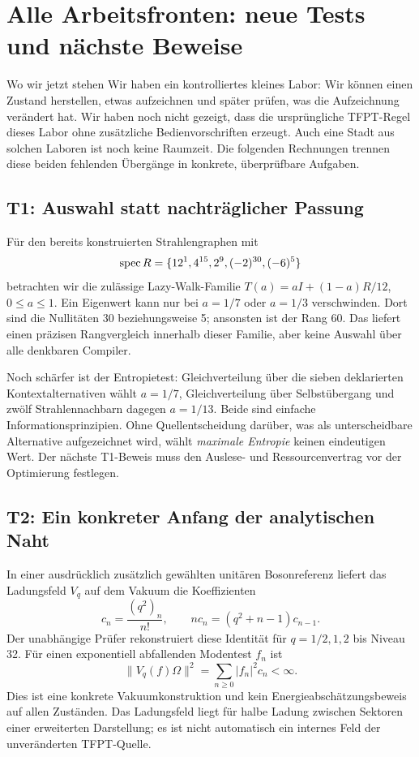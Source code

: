 \chapter{Alle Arbeitsfronten: neue Tests und nächste Beweise}
\label{ch:fronts14}

\begin{bild}{Wo wir jetzt stehen}
Wir haben ein kontrolliertes kleines Labor: Wir können einen Zustand herstellen, etwas aufzeichnen und später prüfen, was die Aufzeichnung verändert hat. Wir haben noch nicht gezeigt, dass die ursprüngliche TFPT-Regel dieses Labor ohne zusätzliche Bedienvorschriften erzeugt. Auch eine Stadt aus solchen Laboren ist noch keine Raumzeit. Die folgenden Rechnungen trennen diese beiden fehlenden Übergänge in konkrete, überprüfbare Aufgaben.
\end{bild}

\section{T1: Auswahl statt nachträglicher Passung}
Für den bereits konstruierten Strahlengraphen mit
\begin{equation}
\operatorname{spec} R=\{12^1,4^{15},2^9,(-2)^{30},(-6)^5\}
\end{equation}
betrachten wir die zulässige Lazy-Walk-Familie $T(a)=aI+(1-a)R/12$, $0\le a\le1$. Ein Eigenwert kann nur bei $a=1/7$ oder $a=1/3$ verschwinden. Dort sind die Nullitäten 30 beziehungsweise 5; ansonsten ist der Rang 60. Das liefert einen präzisen Rangvergleich innerhalb dieser Familie, aber keine Auswahl über alle denkbaren Compiler.

Noch schärfer ist der Entropietest: Gleichverteilung über die sieben deklarierten Kontextalternativen wählt $a=1/7$, Gleichverteilung über Selbstübergang und zwölf Strahlennachbarn dagegen $a=1/13$. Beide sind einfache Informationsprinzipien. Ohne Quellentscheidung darüber, was als unterscheidbare Alternative aufgezeichnet wird, wählt \emph{maximale Entropie} keinen eindeutigen Wert. Der nächste T1-Beweis muss den Auslese- und Ressourcenvertrag vor der Optimierung festlegen.

\section{T2: Ein konkreter Anfang der analytischen Naht}
In einer ausdrücklich zusätzlich gewählten unitären Bosonreferenz liefert das Ladungsfeld $V_q$ auf dem Vakuum die Koeffizienten
\begin{equation}
c_n=\frac{(q^2)_n}{n!},\qquad nc_n=(q^2+n-1)c_{n-1}.
\end{equation}
Der unabhängige Prüfer rekonstruiert diese Identität für $q=1/2,1,2$ bis Niveau 32. Für einen exponentiell abfallenden Modentest $f_n$ ist
\begin{equation}
\|V_q(f)\Omega\|^2=\sum_{n\ge0}|f_n|^2c_n<\infty.
\end{equation}
Dies ist eine konkrete Vakuumkonstruktion und kein Energieabschätzungsbeweis auf allen Zuständen. Das Ladungsfeld liegt für halbe Ladung zwischen Sektoren einer erweiterten Darstellung; es ist nicht automatisch ein internes Feld der unveränderten TFPT-Quelle.

